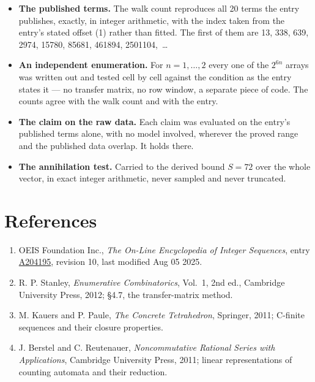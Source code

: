 \documentclass[11pt]{article}
\theoremstyle{definition}
\begin{document}
\begin{itemize}

\item {\bfseries The published terms.} The walk count reproduces all 20 terms the entry publishes, exactly, in integer arithmetic, with the index taken from the entry's stated offset (1) rather than fitted. The first of them are 13, 338, 639, 2974, 15780, 85681, 461894, 2501104,~\dots

\item {\bfseries An independent enumeration.} For $n = 1,\dots,2$ every one of the $2^{6n}$ arrays was written out and tested cell by cell against the condition as the entry states it --- no transfer matrix, no row window, a separate piece of code. The counts agree with the walk count and with the entry.

\item {\bfseries The claim on the raw data.} Each claim was evaluated on the entry's published terms alone, with no model involved, wherever the proved range and the published data overlap. It holds there.

\item {\bfseries The annihilation test.} Carried to the derived bound $S = 72$ over the whole vector, in exact integer arithmetic, never sampled and never truncated.

\end{itemize}

\section{References}

\begin{enumerate}

\item OEIS Foundation Inc., \emph{The On-Line Encyclopedia of Integer Sequences}, entry \href{https://oeis.org/A204195}{A204195}, revision 10, last modified Aug 05 2025.

\item R. P. Stanley, \emph{Enumerative Combinatorics}, Vol.~1, 2nd ed., Cambridge University Press, 2012; \S4.7, the transfer-matrix method.

\item M. Kauers and P. Paule, \emph{The Concrete Tetrahedron}, Springer, 2011; C-finite sequences and their closure properties.

\item J. Berstel and C. Reutenauer, \emph{Noncommutative Rational Series with Applications}, Cambridge University Press, 2011; linear representations of counting automata and their reduction.

\end{enumerate}
\end{document}
